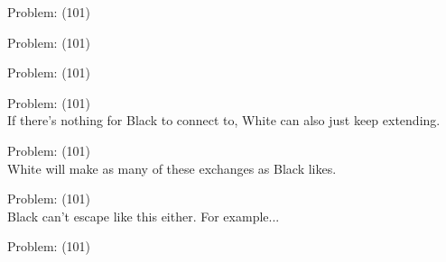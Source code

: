 \documentclass[11pt]{article}
\begin{document}
\begin{minipage}[t]{0.5\textwidth}
  {\centering
  
  Problem: (101)\\
  
  }
\end{minipage}
\begin{minipage}[t]{0.5\textwidth}
  {\centering
  
  Problem: (101)\\
  
  }
\end{minipage}
\begin{minipage}[t]{0.5\textwidth}
  {\centering
  
  Problem: (101)\\
  
  }
\end{minipage}
\begin{minipage}[t]{0.5\textwidth}
  {\centering
  
  Problem: (101)\\
  If there's nothing for Black to connect to, White can also just keep extending.\\
  }
\end{minipage}
\begin{minipage}[t]{0.5\textwidth}
  {\centering
  
  Problem: (101)\\
  White will make as many of these exchanges as Black likes.\\
  }
\end{minipage}
\begin{minipage}[t]{0.5\textwidth}
  {\centering
  
  Problem: (101)\\
  Black can't escape like this either. For example...\\
  }
\end{minipage}
\begin{minipage}[t]{0.5\textwidth}
  {\centering
  
  Problem: (101)\\
  
  }
\end{minipage}
\end{document}
